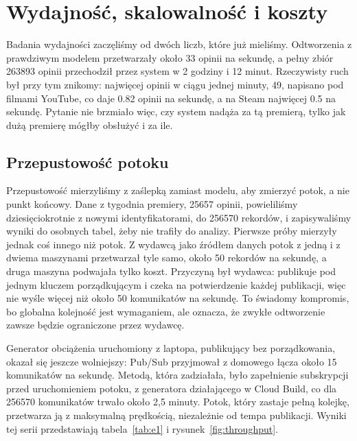 \section{Wydajność, skalowalność i koszty}
\label{sec:eval-performance}

Badania wydajności zaczęliśmy od dwóch liczb, które już mieliśmy.
Odtworzenia z prawdziwym modelem przetwarzały około 33 opinii na sekundę, a pełny zbiór \num{263893} opinii przechodził przez system w 2 godziny i 12 minut.
Rzeczywisty ruch był przy tym znikomy: najwięcej opinii w ciągu jednej minuty, 49, napisano pod filmami YouTube, co daje \num{0.82} opinii na sekundę, a na Steam najwięcej \num{0.5} na sekundę.
Pytanie nie brzmiało więc, czy system nadąża za tą premierą, tylko jak dużą premierę mógłby obsłużyć i za ile.

\subsection{Przepustowość potoku}
\label{sec:eval-throughput}

Przepustowość mierzyliśmy z zaślepką zamiast modelu, aby zmierzyć potok, a nie punkt końcowy.
Dane z tygodnia premiery, \num{25657} opinii, powieliliśmy dziesięciokrotnie z nowymi identyfikatorami, do \num{256570} rekordów, i zapisywaliśmy wyniki do osobnych tabel, żeby nie trafiły do analizy.
Pierwsze próby mierzyły jednak coś innego niż potok.
Z wydawcą jako źródłem danych potok z jedną i z dwiema maszynami przetwarzał tyle samo, około 50 rekordów na sekundę, a druga maszyna podwajała tylko koszt.
Przyczyną był wydawca: publikuje pod jednym kluczem porządkującym i czeka na potwierdzenie każdej publikacji, więc nie wyśle więcej niż około 50 komunikatów na sekundę.
To świadomy kompromis, bo globalna kolejność jest wymaganiem, ale oznacza, że zwykłe odtworzenie zawsze będzie ograniczone przez wydawcę.

Generator obciążenia uruchomiony z laptopa, publikujący bez porządkowania, okazał się jeszcze wolniejszy: Pub/Sub przyjmował z domowego łącza około 15 komunikatów na sekundę.
Metodą, która zadziałała, było zapełnienie subskrypcji przed uruchomieniem potoku, z generatora działającego w Cloud Build, co dla \num{256570} komunikatów trwało około 2,5 minuty.
Potok, który zastaje pełną kolejkę, przetwarza ją z maksymalną prędkością, niezależnie od tempa publikacji.
Wyniki tej serii przedstawiają tabela~\ref{tab:e1} i rysunek~\ref{fig:throughput}.

